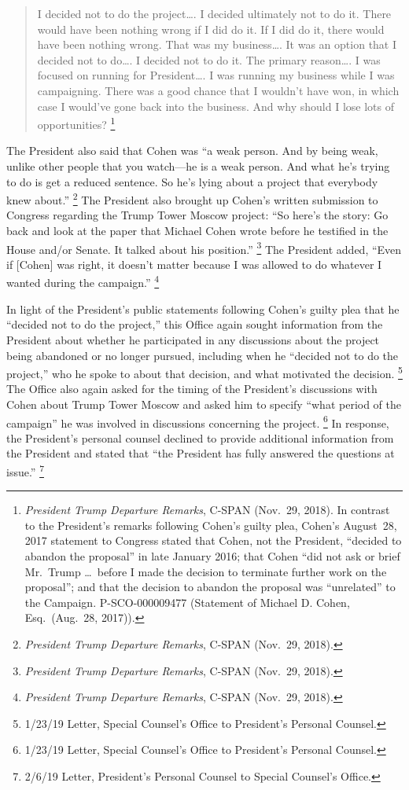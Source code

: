 \begin{quote}
I decided not to do the project\dots.
I decided ultimately not to do it.
There would have been nothing wrong if I did do it.
If I did do it, there would have been nothing wrong.
That was my business\dots.
It was an option that I decided not to do\dots.
I decided not to do it.
The primary reason\dots.
I was focused on running for President\dots.
I was running my business while I was campaigning.
There was a good chance that I wouldn't have won, in which case I would've gone back into the business.
And why should I lose lots of opportunities?%
\footnote{\textit{President Trump Departure Remarks}, C-SPAN (Nov.~29, 2018).
In contrast to the President's remarks following Cohen's guilty plea, Cohen's August~28, 2017 statement to Congress stated that Cohen, not the President, ``decided to abandon the proposal'' in late January 2016;
that Cohen ``did not ask or brief Mr.~Trump \dots\ before I made the decision to terminate further work on the proposal'';
and that the decision to abandon the proposal was ``unrelated'' to the Campaign. P-SCO-000009477 (Statement of Michael D. Cohen, Esq.\ (Aug.~28, 2017)).
}
\end{quote}

The President also said that Cohen was ``a weak person.
And by being weak, unlike other people that you watch---he is a weak person.
And what he's trying to do is get a reduced sentence.
So he's lying about a project that everybody knew about.''%
\footnote{\textit{President Trump Departure Remarks}, C-SPAN (Nov.~29, 2018).}
The President also brought up Cohen's written submission to Congress regarding the Trump Tower Moscow project:
``So here's the story: Go back and look at the paper that Michael Cohen wrote before he testified in the House and/or Senate.
It talked about his position.''%
\footnote{\textit{President Trump Departure Remarks}, C-SPAN (Nov.~29, 2018).}
The President added, ``Even if [Cohen] was right, it doesn't matter because I was allowed to do whatever I wanted during the campaign.''%
\footnote{\textit{President Trump Departure Remarks}, C-SPAN (Nov.~29, 2018).}

In light of the President's public statements following Cohen's guilty plea that he ``decided not to do the project,'' this Office again sought information from the President about whether he participated in any discussions about the project being abandoned or no longer pursued, including when he ``decided not to do the project,'' who he spoke to about that decision, and what motivated the decision.%
\footnote{1/23/19 Letter, Special Counsel's Office to President's Personal Counsel.}
The Office also again asked for the timing of the President's discussions with Cohen about Trump Tower Moscow and asked him to specify ``what period of the campaign'' he was involved in discussions concerning the project.%
\footnote{1/23/19 Letter, Special Counsel's Office to President's Personal Counsel.}
In response, the President's personal counsel declined to provide additional information from the President and stated that ``the President has fully answered the questions at issue.''%
\footnote{2/6/19 Letter, President's Personal Counsel to Special Counsel's Office.}

